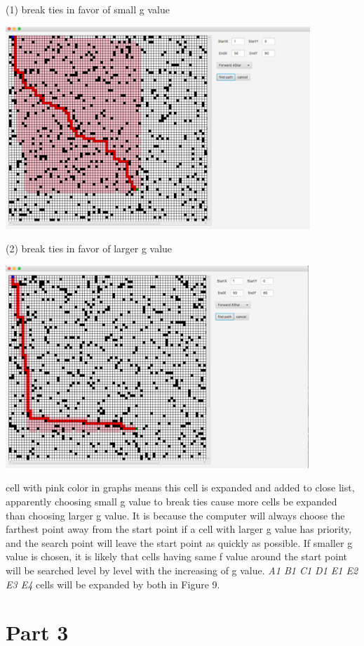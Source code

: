 \documentclass[12pt]{amsart}
\begin{document}
(1) break ties in favor of small g value

\includegraphics[width=1\linewidth,height=3in]{small_g.png}

(2) break ties in favor of larger g value

\includegraphics[width=1\linewidth,height=3in]{big_g.png}

cell with pink color in graphs means this cell is expanded and added to close list, apparently choosing small g value to break ties cause more cells be expanded than choosing larger g value. It is because the computer will always choose the farthest point away from the start point if a cell with larger g value has priority, and the search point will leave the start point as quickly as possible. If smaller g value is chosen, it is likely that cells having same f value around the start point will be searched level by level with the increasing of g value. \emph{A1 B1 C1 D1 E1 E2 E3 E4} cells will be expanded by both in Figure 9.
\newpage
\section*{Part 3}
\end{document}
